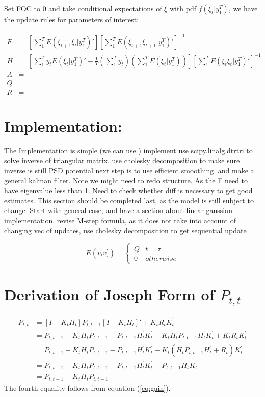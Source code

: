 \documentclass[12pt]{article}
\numberwithin{equation}{section}
\begin{document}
Set FOC to 0 and take conditional expectations of $\xi$ with pdf $f(\xi_t|y_1^T)$, we have the update rules for parameters of interest:

\begin{align}
    F &= \left[\sum_1^{T}E(\xi_{t+1}\xi_{t}|y_1^T)'\right] \left[\sum_1^{T}E(\xi_{t+1}\xi_{t+1}|y_1^T)'\right]^{-1} \\
    H &= \left[\sum_1^{T}y_tE(\xi_{t}|y_1^T)' - \frac{1}{T}\left(\sum_1^Ty_t\right)\left(\sum_1^TE(\xi_t|y_1^T)\right)\right] 
    \left[\sum_1^{T}E(\xi_{t}\xi_{t}|y_1^T)'\right]^{-1} \\
    A &= \\
    Q &= \\
    R &= 
\end{align}
\section{Implementation:} \label{sec:implement}
The Implementation is simple (we can use )
implement
use scipy.linalg.dtrtri to solve inverse of triangular matrix.
use cholesky decomposition to make sure inverse is still PSD
potential next step is to use efficient smoothing.
and make a general kalman filter. 
Note we might need to redo structure. As the F need to have eigenvalue less than 1. Need to check whether diff is necessary to get good estimates. This section should be completed last, as the model is still subject to change.
Start with general case, and have a section about linear gaussian implementation.
revise M-step formula, as it does not take into account of changing vec of updates, use cholesky decomposition to get sequential update 

\[
    E(v_{t}v_{\tau}^{'})=\begin{cases}
        Q & t=\tau \\
        0 & otherwise
    \end{cases} 
\]
\printbibliography
\appendix
\section{Derivation of Joseph Form of $P_{t,t}$} \label{ap:joseph}
\begin{align*}
    P_{t,t} &= [I - K_tH_t]P_{t,t-1}[I - K_tH_t]' + K_tR_tK_t^{'} \\
    &= P_{t,t-1} - K_tH_tP_{t,t-1} - P_{t,t-1}H_t^{'}K_t^{'} + K_tH_tP_{t,t-1}H_t^{'}K_t^{'} + K_tR_tK_t^{'} \\
    &= P_{t,t-1} - K_tH_tP_{t,t-1} - P_{t,t-1}H_t^{'}K_t^{'} + K_t(H_tP_{t,t-1}H_t^{'} + R_t)K_t^{'} \\
    &= P_{t,t-1} - K_tH_tP_{t,t-1} - P_{t,t-1}H_t^{'}K_t^{'} + P_{t,t-1}H_t^{'}K_t^{'} \\
    &= P_{t,t-1} - K_tH_tP_{t,t-1}
\end{align*}
The fourth equality follows from equation (\ref{eq:gain}). 
\end{document}
